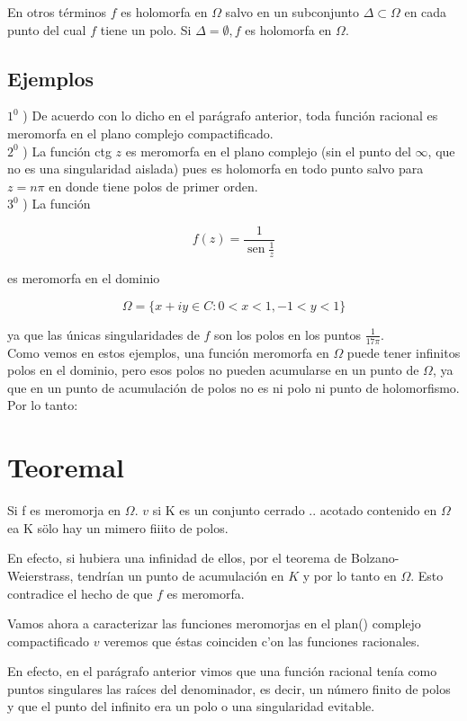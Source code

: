 \documentclass[10pt]{article}
\theoremstyle{plain}
\theoremstyle{definition}
\theoremstyle{remark}
\begin{document}
En otros términos $f$ es holomorfa en $\Omega$ salvo en un subconjunto $\Delta \subset \Omega$ en cada punto del cual $f$ tiene un polo. Si $\Delta=\emptyset, f$ es holomorfa en $\Omega$.

\subsection{Ejemplos}
$1^{0}$ ) De acuerdo con lo dicho en el parágrafo anterior, toda función racional es meromorfa en el plano complejo compactificado.\\
$2^{0}$ ) La función ctg $z$ es meromorfa en el plano complejo (sin el punto del $\infty$, que no es una singularidad aislada) pues es holomorfa en todo punto salvo para $z=n \pi$ en donde tiene polos de primer orden.\\
$3^{0}$ ) La función

$$
f(z)=\frac{1}{\operatorname{sen} \frac{1}{z}}
$$

es meromorfa en el dominio

$$
\Omega=\{x+i y \in C: 0<x<1,-1<y<1\}
$$

ya que las únicas singularidades de $f$ son los polos en los puntos $\frac{1}{17 \pi}$.\\
Como vemos en estos ejemplos, una función meromorfa en $\Omega$ puede tener infinitos polos en el dominio, pero esos polos no pueden acumularse en un punto de $\Omega$, ya que en un punto de acumulación de polos no es ni polo ni punto de holomorfismo. Por lo tanto:

\section*{Teoremal}
Si f es meromorja en $\Omega$. $v$ si K es un conjunto cerrado .. acotado contenido en $\Omega$ ea K sölo hay un mimero fiiito de polos.

En efecto, si hubiera una infinidad de ellos, por el teorema de Bolzano-Weierstrass, tendrían un punto de acumulación en $K$ y por lo tanto en $\Omega$. Esto contradice el hecho de que $f$ es meromorfa.

Vamos ahora a caracterizar las funciones meromorjas en el plan() complejo compactificado $v$ veremos que éstas coinciden c'on las funciones racionales.

En efecto, en el parágrafo anterior vimos que una función racional tenía como puntos singulares las raíces del denominador, es decir, un número finito de polos y que el punto del infinito era un polo o una singularidad evitable.
\end{document}
